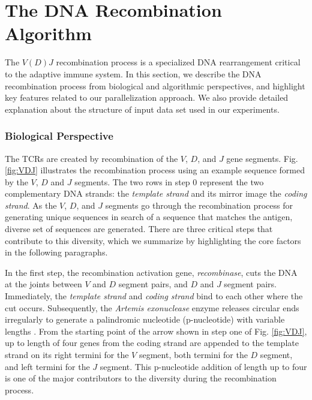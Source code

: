 \chapter{The DNA Recombination Algorithm}\label{sec:DNA}

The $V(D)J$ recombination process is a specialized DNA rearrangement critical to the adaptive immune system.
In this section, we describe the DNA recombination process from biological and algorithmic perspectives, and highlight key features related to our parallelization approach. We also provide detailed explanation about the structure of input data set used in our experiments.
\subsection{Biological Perspective} \label{subsec:Bio}

The TCRs are created by recombination of the $V$, $D$, and $J$ gene segments. Fig. \ref{fig:VDJ} illustrates the recombination process using an example sequence formed by the $V$, $D$ and $J$ segments. The two rows in step 0 represent the two complementary DNA strands: the \emph{template strand} and its mirror image the \emph{coding strand}. As the $V$, $D$, and $J$ segments go through the recombination process for generating unique sequences in search of a sequence that matches the antigen, diverse set of sequences are generated. There are three critical steps that contribute to this diversity, which we summarize by highlighting the core factors in the following paragraphs.

In the first step, the recombination activation gene, \emph{recombinase}, cuts the DNA at the joints between $V$ and $D$ segment pairs, and $D$ and $J$ segment pairs. Immediately, the \emph{template strand} and \emph{coding strand} bind to each other where the cut occurs. Subsequently, the \emph{Artemis exonuclease} enzyme releases circular ends irregularly to generate a palindromic nucleotide (p-nucleotide) with variable lengths \cite{b4,b10,b11}. 
From the starting point of the arrow shown in step one of Fig. \ref{fig:VDJ}, up to length of four genes from the coding strand are appended to the template strand on its right termini for the $V$ segment, both termini for the $D$ segment, and left termini for the $J$ segment. This p-nucleotide addition of length up to four is one of the major contributors to the diversity during the recombination process.   


